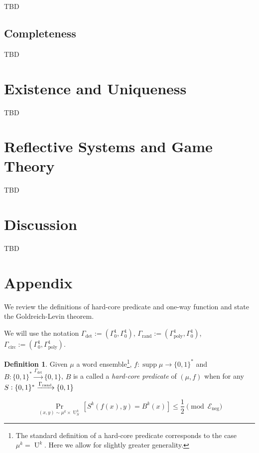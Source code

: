 \documentclass{article}
\numberwithin{equation}{section}
\theoremstyle{definition}
\newtheorem{definition}{Definition}[section]
\theoremstyle{plain}
\newcommand{\Bool}{\{0,1\}}
\newcommand{\Words}{{\Bool^*}}
\DeclareMathOperator{\Supp}{supp}
\DeclareMathOperator{\Prb}{Pr}
\DeclareMathOperator{\Un}{U}
\newcommand{\Fall}{\mathcal{E}}
\begin{document}
TBD

\subsection{Completeness}

TBD

\section{Existence and Uniqueness}
\label{sec:e_and_u}


TBD

\section{Reflective Systems and Game Theory}
\label{sec:reflective}


TBD

\section{Discussion}
\label{sec:discussion}

TBD

\appendix

\section{Appendix}

We review the definitions of hard-core predicate and one-way function and state the Goldreich-Levin theorem.

We will use the notation $\Gamma_{\text{det}}:=(\Gamma_0^1,\Gamma_0^1)$, $\Gamma_{\text{rand}}:=(\Gamma_{\text{poly}}^1,\Gamma_0^1)$, ${\Gamma_{\text{circ}}:=(\Gamma_0^1,\Gamma_{\text{poly}}^1)}$.

\begin{samepage}
\begin{definition}

Given $\mu$ a word ensemble\footnote{The standard definition of a hard-core predicate corresponds to the case $\mu^k=\Un^k$. Here we allow for slightly greater generality.}, $f: \Supp \mu \rightarrow \Words$ and ${B: \Words \xrightarrow{\Gamma_{\text{det}}} \Bool}$, $B$ is a called a \emph{hard-core predicate} of $(\mu,f)$ when for any $S: \Words \xrightarrow{\Gamma_{\textnormal{rand}}} \Bool$

\begin{equation}
\Prb_{(x,y) \sim \mu^k \times \Un_S^k}[S^k(f(x),y)=B^k(x)] \leq \frac{1}{2} \pmod {\Fall_{\text{neg}}}
\end{equation}

\end{definition}
\end{samepage}
\end{document}
